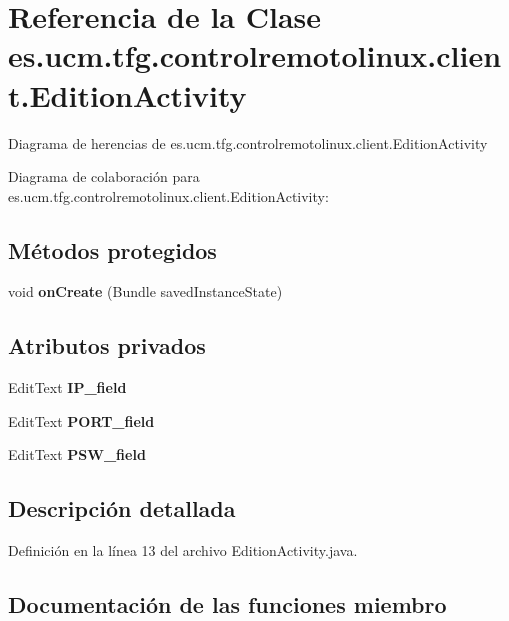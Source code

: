 \section{Referencia de la Clase es.\-ucm.\-tfg.\-controlremotolinux.\-client.\-Edition\-Activity}
\label{classes_1_1ucm_1_1tfg_1_1controlremotolinux_1_1client_1_1EditionActivity}


Diagrama de herencias de es.\-ucm.\-tfg.\-controlremotolinux.\-client.\-Edition\-Activity


Diagrama de colaboración para es.\-ucm.\-tfg.\-controlremotolinux.\-client.\-Edition\-Activity\-:
\subsection*{Métodos protegidos}
\begin{DoxyCompactItemize}
\item 
void {\bf on\-Create} (Bundle saved\-Instance\-State)
\end{DoxyCompactItemize}
\subsection*{Atributos privados}
\begin{DoxyCompactItemize}
\item 
Edit\-Text {\bf I\-P\-\_\-field}
\item 
Edit\-Text {\bf P\-O\-R\-T\-\_\-field}
\item 
Edit\-Text {\bf P\-S\-W\-\_\-field}
\end{DoxyCompactItemize}


\subsection{Descripción detallada}


Definición en la línea 13 del archivo Edition\-Activity.\-java.



\subsection{Documentación de las funciones miembro}
